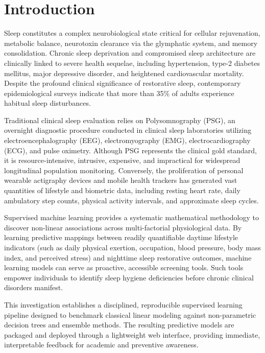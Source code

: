 \documentclass[12pt,a4paper]{article}
\begin{document}
\section{Introduction}
Sleep constitutes a complex neurobiological state critical for cellular rejuvenation, metabolic balance, neurotoxin clearance via the glymphatic system, and memory consolidation. Chronic sleep deprivation and compromised sleep architecture are clinically linked to severe health sequelae, including hypertension, type-2 diabetes mellitus, major depressive disorder, and heightened cardiovascular mortality. Despite the profound clinical significance of restorative sleep, contemporary epidemiological surveys indicate that more than 35\% of adults experience habitual sleep disturbances.

Traditional clinical sleep evaluation relies on Polysomnography (PSG), an overnight diagnostic procedure conducted in clinical sleep laboratories utilizing electroencephalography (EEG), electromyography (EMG), electrocardiography (ECG), and pulse oximetry. Although PSG represents the clinical gold standard, it is resource-intensive, intrusive, expensive, and impractical for widespread longitudinal population monitoring. Conversely, the proliferation of personal wearable actigraphy devices and mobile health trackers has generated vast quantities of lifestyle and biometric data, including resting heart rate, daily ambulatory step counts, physical activity intervals, and approximate sleep cycles.

Supervised machine learning provides a systematic mathematical methodology to discover non-linear associations across multi-factorial physiological data. By learning predictive mappings between readily quantifiable daytime lifestyle indicators (such as daily physical exertion, occupation, blood pressure, body mass index, and perceived stress) and nighttime sleep restorative outcomes, machine learning models can serve as proactive, accessible screening tools. Such tools empower individuals to identify sleep hygiene deficiencies before chronic clinical disorders manifest.

This investigation establishes a disciplined, reproducible supervised learning pipeline designed to benchmark classical linear modeling against non-parametric decision trees and ensemble methods. The resulting predictive models are packaged and deployed through a lightweight web interface, providing immediate, interpretable feedback for academic and preventive awareness.
\end{document}
